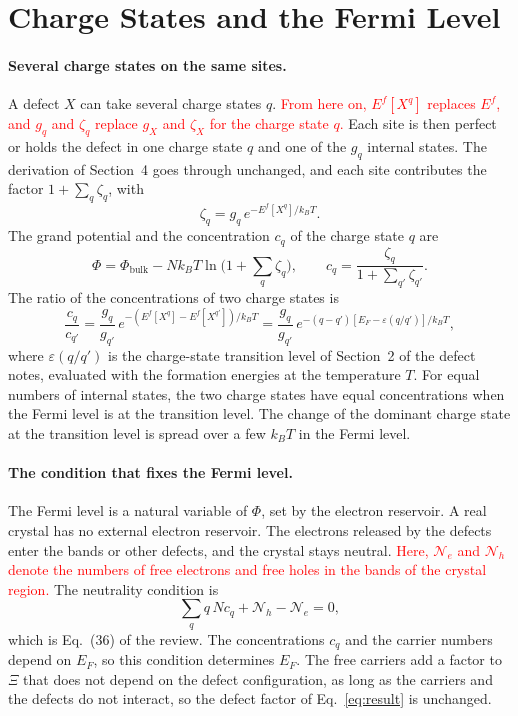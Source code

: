 \documentclass[11pt]{article}      %
\numberwithin{equation}{section}   %
\begin{document}
\section{Charge States and the Fermi Level}

\paragraph{Several charge states on the same sites.}
A defect $X$ can take several charge states $q$. \textcolor{red}{From here
on, $E^f[X^q]$ replaces $E^f$, and $g_q$ and $\zeta_q$ replace $g_X$ and
$\zeta_X$ for the charge state $q$.} Each site is then perfect or holds the
defect in one charge state $q$ and one of the $g_q$ internal states. The
derivation of Section~4 goes through unchanged, and each site contributes
the factor $1+\sum_q\zeta_q$, with
\begin{equation*}
    \zeta_q=g_q\,e^{-E^f[X^q]/k_BT}.
\end{equation*}
The grand potential and the concentration $c_q$ of the charge state $q$ are
\begin{equation}
    \boxed{\Phi=\Phi_{\text{bulk}}-Nk_BT\ln\Big(1+\sum_q\zeta_q\Big),
    \qquad
    c_q=\frac{\zeta_q}{1+\sum_{q'}\zeta_{q'}}.}
\end{equation}
The ratio of the concentrations of two charge states is
\begin{equation}
    \boxed{\frac{c_q}{c_{q'}}
    =\frac{g_q}{g_{q'}}\,e^{-\left(E^f[X^q]-E^f[X^{q'}]\right)/k_BT}
    =\frac{g_q}{g_{q'}}\,
    e^{-(q-q')\left[E_F-\varepsilon(q/q')\right]/k_BT},}
\end{equation}
where $\varepsilon(q/q')$ is the charge-state transition level of Section~2
of the defect notes, evaluated with the formation energies at the
temperature $T$. For equal numbers of internal states, the two charge
states have equal concentrations when the Fermi level is at the transition
level. The change of the dominant charge state at the transition level is
spread over a few $k_BT$ in the Fermi level.

\paragraph{The condition that fixes the Fermi level.}
The Fermi level is a natural variable of $\Phi$, set by the electron
reservoir. A real crystal has no external electron reservoir. The electrons
released by the defects enter the bands or other defects, and the crystal
stays neutral. \textcolor{red}{Here, $\mathcal{N}_e$ and $\mathcal{N}_h$
denote the numbers of free electrons and free holes in the bands of the
crystal region.} The neutrality condition is
\begin{equation}
    \boxed{\sum_q q\,N c_q+\mathcal{N}_h-\mathcal{N}_e=0,}
\end{equation}
which is Eq.~(36) of the review. The concentrations $c_q$ and the carrier
numbers depend on $E_F$, so this condition determines $E_F$. The free
carriers add a factor to $\Xi$ that does not depend on the defect
configuration, as long as the carriers and the defects do not interact, so
the defect factor of Eq.~\eqref{eq:result} is unchanged.
\end{document}
